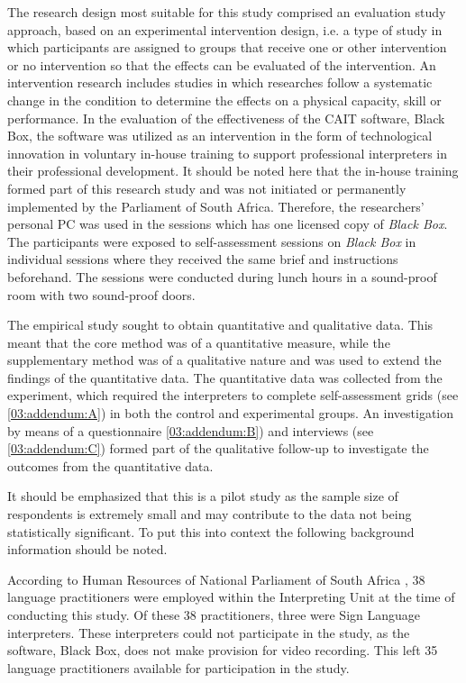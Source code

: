 \documentclass[output=paper]{langsci/langscibook}
\begin{document}
The research design most suitable for this study comprised an evaluation study approach, based on an experimental intervention design, i.e. a type of study in which participants are assigned to groups that receive one or other intervention or no intervention so that the effects can be evaluated of the intervention. An intervention research includes studies in which researches follow a systematic change in the condition to determine the effects on a physical capacity, skill or performance. In the evaluation of the effectiveness of the \textsc{CAIT} software, Black Box, the software was utilized as an intervention in the form of technological innovation in voluntary in-house training to support professional interpreters in their professional development. It should be noted here that the in-house training formed part of this research study and was not initiated or permanently implemented by the Parliament of South Africa. Therefore, the researchers’ personal PC was used in the sessions which has one licensed copy of \textit{Black Box}. The participants were exposed to self-assessment sessions on \textit{Black Box} in individual sessions where they received the same brief and instructions beforehand. The sessions were conducted during lunch hours in a sound-proof room with two sound-proof doors. 

The empirical study sought to obtain quantitative and qualitative data. This meant that the core method was of a quantitative measure, while the supplementary method was of a qualitative nature and was used to extend the findings of the quantitative data. The quantitative data was collected from the experiment, which required the interpreters to complete self-assessment grids (see \ref{03:addendum:A}) in both the control and experimental groups. An investigation by means of a questionnaire \ref{03:addendum:B}) and interviews (see \ref{03:addendum:C}) formed part of the qualitative follow-up to investigate the outcomes from the quantitative data.

It should be emphasized that this is a pilot study as the sample size of respondents is extremely small and may contribute to the data not being statistically significant. To put this into context the following background information should be noted. 

According to Human Resources of National Parliament of South Africa \citep{Moorad2017}, 38 language practitioners were employed within the Interpreting Unit at the time of conducting this study. Of these 38 practitioners, three were Sign Language interpreters. These interpreters could not participate in the study, as the software, Black Box, does not make provision for video recording. This left 35 language practitioners available for participation in the study. 
\end{document}
